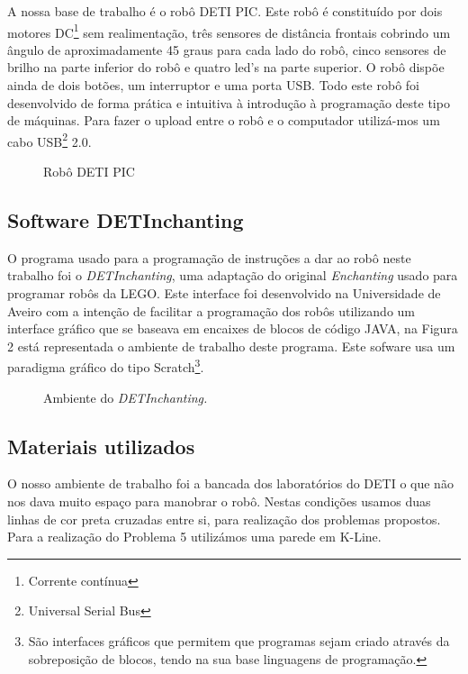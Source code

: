 \documentclass[a4paper, 12pt, onecolumn, oneside]{report}
\begin{document}
A nossa base de trabalho é o robô DETI PIC. Este robô é constituído por dois motores DC\footnote{Corrente contínua} sem realimentação, três sensores de distância frontais cobrindo um ângulo de aproximadamente 45 graus para cada lado do robô, cinco sensores de brilho na parte inferior do robô e quatro led's na parte superior. O robô dispõe ainda de dois botões, um interruptor e uma porta USB. Todo este robô foi desenvolvido de forma prática e intuitiva à introdução à programação deste tipo de máquinas. 
Para fazer o upload entre o robô e o computador utilizá-mos um cabo USB\footnote{Universal Serial Bus} 2.0.



\begin{figure}[H] 
\caption{Robô DETI PIC}
\label{fig:speciation}
\end{figure}


\subsection{Software DETInchanting}

O programa usado para a programação de instruções a dar ao robô neste trabalho foi o \emph{DETInchanting}, uma adaptação do original \emph{Enchanting} usado para programar robôs da LEGO. Este interface foi desenvolvido na Universidade de Aveiro com a intenção de facilitar a programação dos robôs utilizando um interface gráfico que se baseava em encaixes de blocos de código JAVA, na Figura 2 está representada o ambiente de trabalho deste programa. Este sofware usa um paradigma gráfico do tipo Scratch\footnote{São interfaces gráficos que permitem que programas sejam criado através da sobreposição de blocos, tendo na sua base linguagens de programação.}.



\begin{figure}[H] 
\caption{Ambiente do \emph{DETInchanting.}}
\label{fig:speciation}
\end{figure}




\subsection{Materiais utilizados}

O nosso ambiente de trabalho foi a bancada dos laboratórios do DETI o que não nos dava muito espaço para manobrar o robô. Nestas condições usamos duas linhas de cor preta cruzadas entre si, para realização dos problemas propostos. Para a realização do Problema 5 utilizámos uma parede em K-Line.  
\end{document}
